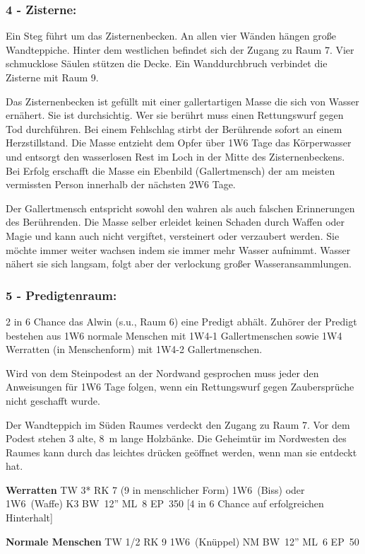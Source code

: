 \subsubsection{4 - Zisterne:} Ein Steg führt um das Zisternenbecken. An allen vier
Wänden hängen große Wandteppiche. Hinter dem westlichen befindet sich
der Zugang zu Raum 7. Vier schmucklose Säulen stützen die Decke. Ein
Wanddurchbruch verbindet die Zisterne mit Raum 9.  

Das Zisternenbecken ist
gefüllt mit einer gallertartigen Masse die sich von Wasser ernähert. Sie
ist durchsichtig. Wer sie berührt muss einen Rettungswurf gegen Tod
durchführen. Bei einem Fehlschlag stirbt der Berührende sofort an
einem Herzstillstand. Die Masse entzieht dem Opfer über 1W6 Tage das
Körperwasser und entsorgt den wasserlosen Rest im Loch in der Mitte
des Zisternenbeckens. Bei Erfolg erschafft die Masse ein Ebenbild
(Gallertmensch) der am meisten vermissten Person innerhalb der nächsten
2W6 Tage. 

Der Gallertmensch entspricht sowohl den wahren als auch falschen
Erinnerungen des Berührenden.  Die Masse selber erleidet keinen Schaden
durch Waffen oder Magie und kann auch nicht vergiftet, versteinert oder
verzaubert werden. Sie möchte immer weiter wachsen indem sie immer
mehr Wasser aufnimmt. Wasser nähert sie sich langsam, folgt aber der
verlockung großer Wasseransammlungen.

\subsubsection{5 - Predigtenraum:} 2 in 6 Chance das Alwin (s.u., Raum 6)
eine Predigt abhält. Zuhörer
der Predigt bestehen aus 1W6 normale Menschen mit 1W4-1 Gallertmenschen
sowie 1W4 Werratten (in Menschenform) mit 1W4-2 Gallertmenschen. 

Wird von
dem Steinpodest an der Nordwand gesprochen muss jeder den Anweisungen
für 1W6 Tage folgen, wenn ein Rettungswurf gegen Zaubersprüche nicht
geschafft wurde. 

Der Wandteppich im Süden Raumes verdeckt den Zugang
zu Raum 7. Vor dem Podest stehen 3 alte, 8~m lange Holzbänke. Die
Geheimtür im Nordwesten des Raumes kann durch das leichtes drücken
geöffnet werden, wenn man sie entdeckt hat.  

\textbf{Werratten} TW 3* RK 7 (9
in menschlicher Form) 1W6~(Biss) oder 1W6~(Waffe) K3 BW~12'' ML~8 EP~350
[4 in 6 Chance auf erfolgreichen Hinterhalt] 

\textbf{Normale Menschen} TW 1/2 RK 9 1W6~(Knüppel) NM BW~12'' ML~6 EP~50


